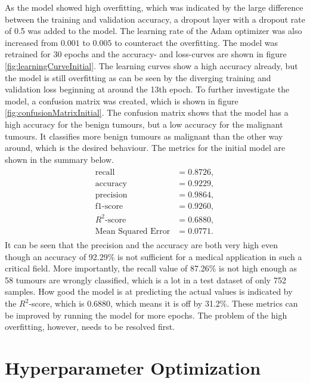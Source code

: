 As the model showed high overfitting, which was indicated by the large difference between the training and validation accuracy, a dropout layer with a dropout rate of 0.5 was added to the model.
The learning rate of the Adam optimizer was also increased from $0.001$ to $0.005$ to counteract the overfitting.
The model was retrained for 30 epochs and the accuracy- and loss-curves are shown in figure \ref{fig:learningCurveInitial}.
The learning curves show a high accuracy already, but the model is still overfitting as can be seen by the diverging training and validation loss beginning at around the 13th epoch.
\newline
To further investigate the model, a confusion matrix was created, which is shown in figure \ref{fig:confusionMatrixInitial}.
The confusion matrix shows that the model has a high accuracy for the benign tumours, but a low accuracy for the malignant tumours.
It classifies more benign tumours as malignant than the other way around, which is the desired behaviour.
The metrics for the initial model are shown in the summary below.
\begin{align}
    \label{eq:metricsInitialCNN}
    \begin{split}
        \text{recall} &= 0.8726, \\
        \text{accuracy} &= 0.9229, \\
        \text{precision} &= 0.9864, \\
        \text{f1-score} &= 0.9260, \\
        R^2\text{-score} &= 0.6880, \\
        \text{Mean Squared Error} &= 0.0771.
    \end{split}
\end{align}
It can be seen that the precision and the accuracy are both very high even though an accuracy of 92.29\% is not sufficient for a medical application in such a critical field.
More importantly, the recall value of 87.26\% is not high enough as 58 tumours are wrongly classified, which is a lot in a test dataset of only 752 samples.
How good the model is at predicting the actual values is indicated by the $R^2$-score, which is 0.6880, which means it is off by 31.2\%.
These metrics can be improved by running the model for more epochs.
The problem of the high overfitting, however, needs to be resolved first.

\section{Hyperparameter Optimization}
\label{sec:hyperparameter}

